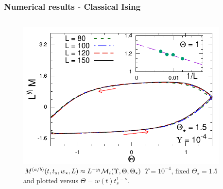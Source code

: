 \begin{frame}
	\frametitle{Numerical results - Classical Ising}
	
	\begin{columns}
	\begin{column}{0.52\textwidth}
	\begin{figure}[!htb]
  		\includegraphics[width=1.\columnwidth]{paper/isC2DT15Y104.pdf}
  		
  		\caption{ \alert{$M^{(a/b)}(t,t_s,w_\star,L) 
				\approx L^{-y_l} {\cal M}_i(\Upsilon,\Theta, \Theta_\star)$}
				$\Upsilon=10^{-4}$, fixed $\Theta_\star =
    				1.5$ and plotted versus $\Theta=w(t) t_s^{1-\kappa}$.  }
  		\label{roundtripM}
	\end{figure}
	\end{column}
	\begin{column}{0.5\textwidth}
	

\end{column}
\end{columns}
\end{frame}
